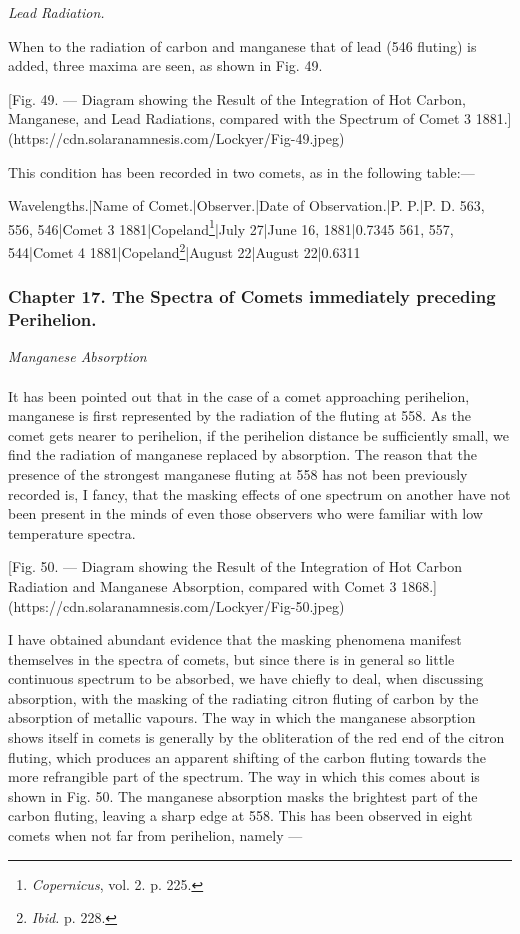 \documentclass[a4paper, 12pt, oneside, polutonikogreek, english]{article}
\begin{document}
\emph{Lead Radiation.}

When to the radiation of carbon and manganese that of lead (546 fluting) is added, three maxima are seen, as shown in Fig. 49.

[Fig. 49. --- Diagram showing the Result of the Integration of Hot Carbon, Manganese, and Lead Radiations, compared with the Spectrum of Comet 3 1881.](https://cdn.solaranamnesis.com/Lockyer/Fig-49.jpeg)

This condition has been recorded in two comets, as in the following table:---

Wavelengths.|Name of Comet.|Observer.|Date of Observation.|P. P.|P. D. 
563, 556, 546|Comet 3 1881|Copeland\footnote{\emph{Copernicus}, vol. 2. p. 225.}|July 27|June 16, 1881|0.7345 
561, 557, 544|Comet 4 1881|Copeland\footnote{\emph{Ibid.} p. 228.}|August 22|August 22|0.6311
\clearpage
\subsubsection{Chapter 17. The Spectra of Comets immediately preceding Perihelion.}
\begin{center}
\emph{Manganese Absorption}
\end{center}
\paragraph{}
It has been pointed out that in the case of a comet approaching perihelion, manganese is first represented by the radiation of the fluting at 558. As the comet gets nearer to perihelion, if the perihelion distance be sufficiently small, we find the radiation of manganese replaced by absorption. The reason that the presence of the strongest manganese fluting at 558 has not been previously recorded is, I fancy, that the masking effects of one spectrum on another have not been present in the minds of even those observers who were familiar with low temperature spectra.

[Fig. 50. --- Diagram showing the Result of the Integration of Hot Carbon Radiation and Manganese Absorption, compared with Comet 3 1868.](https://cdn.solaranamnesis.com/Lockyer/Fig-50.jpeg)

I have obtained abundant evidence that the masking phenomena manifest themselves in the spectra of comets, but since there is in general so little continuous spectrum to be absorbed, we have chiefly to deal, when discussing absorption, with the masking of the radiating citron fluting of carbon by the absorption of metallic vapours. The way in which the manganese absorption shows itself in comets is generally by the obliteration of the red end of the citron fluting, which produces an apparent shifting of the carbon fluting towards the more refrangible part of the spectrum. The way in which this comes about is shown in Fig. 50. The manganese absorption masks the brightest part of the carbon fluting, leaving a sharp edge at 558. This has been observed in eight comets when not far from perihelion, namely ---
\end{document}
